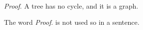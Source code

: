 \documentclass{article}
\newcommand{\p}{{\em Proof}. }
\begin{document}
\noindent {}

\p A tree has no cycle, and it is a graph.

The word \p is not used so in a sentence.
\end{document}

